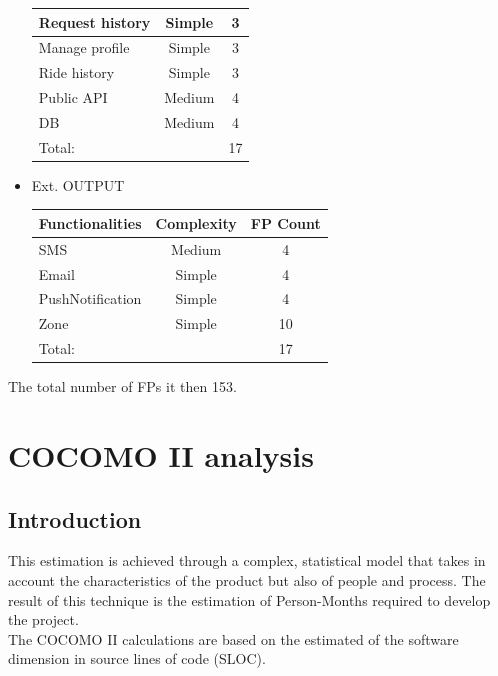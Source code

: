 \documentclass[a4paper,11pt]{report} %
\begin{document}
\begin{itemize}
\begin{center}
\begin{tabular}{| p{7cm} | p{2.5cm} | p{2cm} |}
						Request history & \multicolumn{1}{|c|}{Simple} & \multicolumn{1}{|c|}{3}\\\hline
						Manage profile & \multicolumn{1}{|c|}{Simple} & \multicolumn{1}{|c|}{3}\\\hline
						Ride history & \multicolumn{1}{|c|}{Simple} & \multicolumn{1}{|c|}{3}\\\hline		
						Public API & \multicolumn{1}{|c|}{Medium} & \multicolumn{1}{|c|}{4}\\\hline	
						DB & \multicolumn{1}{|c|}{Medium} & \multicolumn{1}{|c|}{4}\\\hline		

						\multicolumn{2}{|l|}{Total:} & \multicolumn{1}{|c|}{17}\\\hline
					\end{tabular}
				\end{center}
				\item Ext. OUTPUT
				\renewcommand{\arraystretch}{1.2}
				\setlength{\tabcolsep}{12pt}
				\begin{center}
					\begin{tabular}{| p{7cm} | p{2.5cm} | p{2cm} |}\hline
						\textbf{Functionalities} & \multicolumn{1}{|c|}{\textbf{Complexity}} & \textbf{FP Count}\\\hline
						SMS & \multicolumn{1}{|c|}{Medium} & \multicolumn{1}{|c|}{4}\\\hline
						Email & \multicolumn{1}{|c|}{Simple} & \multicolumn{1}{|c|}{4}\\\hline
						PushNotification & \multicolumn{1}{|c|}{Simple} & \multicolumn{1}{|c|}{4}\\\hline		
						Zone & \multicolumn{1}{|c|}{Simple} & \multicolumn{1}{|c|}{10}\\\hline																						
						\multicolumn{2}{|l|}{Total:} & \multicolumn{1}{|c|}{17}\\\hline
					\end{tabular}
				\end{center}																	
			\end{itemize}	
			The total number of FPs it then 153.
	
	\section{COCOMO II analysis}
		\subsection{Introduction}	
			This estimation is achieved through a complex, statistical model that takes in account the characteristics of the product but also of people and process. The result of this technique is the estimation of Person-Months required to develop the project.\\
			The COCOMO II calculations are based on the estimated of the software dimension in source lines of code (SLOC).
	
\end{document}
